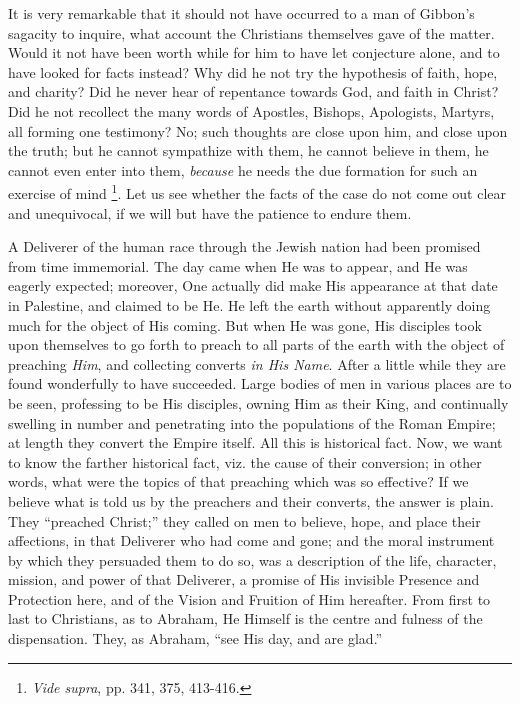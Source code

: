 It is very remarkable that it should not have occurred to a man of
Gibbon's sagacity to inquire, what account the Christians themselves
gave of the matter. Would it not have been worth while for him to have
let conjecture alone, and to have looked for facts instead? Why did he
not try the hypothesis of faith, hope, and charity? Did he never hear
of repentance towards God, and faith in Christ? Did he not recollect
the many words of Apostles, Bishops, Apologists, Martyrs, all
forming one testimony? No; such thoughts are close upon him, and close
upon the truth; but he cannot sympathize with them, he cannot believe
in them, he cannot even enter into them, \emph{because} he needs the
due formation for such an exercise of mind \footnote{\emph{Vide supra},
pp. 341, 375, 413-416.}. Let us see whether the facts of the case do not come out clear
and unequivocal, if we will but have the patience to endure them.

A Deliverer of the human race through the Jewish nation had been
promised from time immemorial. The day came when He was to appear, and
He was eagerly expected; moreover, One actually did make His
appearance at that date in Palestine, and claimed to be He. He left
the earth without apparently doing much for the object of His coming.
But when He was gone, His disciples took upon themselves to go forth
to preach to all parts of the earth with the object of preaching \emph{Him},
and collecting converts \emph{in His Name}. After a little while they are
found wonderfully to have succeeded. Large bodies of men in various
places are to be seen, professing to be His disciples, owning Him as
their King, and continually swelling in number and penetrating into
the populations of the Roman Empire; at length they convert the Empire
itself. All this is historical fact. Now, we want to know the farther
historical fact, viz. the cause of their conversion; in other words,
what were the topics of that preaching which was so effective? If we
believe what is told us by the preachers and their converts, the
answer is plain. They ``preached Christ;'' they called on men
to believe, hope, and place their affections, in that Deliverer
who had come and gone; and the moral instrument by which they
persuaded them to do so, was a description of the life, character,
mission, and power of that Deliverer, a promise of His invisible
Presence and Protection here, and of the Vision and Fruition of Him
hereafter. From first to last to Christians, as to Abraham, He Himself
is the centre and fulness of the dispensation. They, as Abraham,
``see His day, and are glad.''

